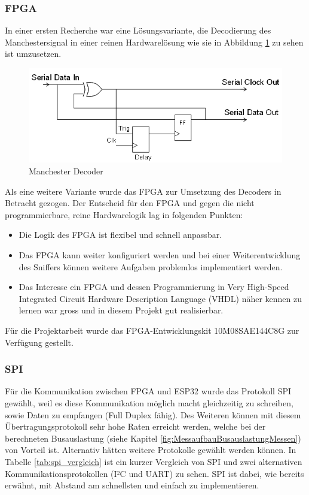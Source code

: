\subsubsection{FPGA}
In einer ersten Recherche war eine Lösungsvariante, die Decodierung des Manchestersignal in einer reinen Hardwarelösung wie sie in Abbildung \ref{fig:Manchester Decoder} zu sehen ist umzusetzen.

\begin{figure}[H]
    \centering
    \includegraphics[width=0.6\linewidth]{Figures/Chap3/Design Eigener Sniffer/manchester_decoder.png}
    \caption{Manchester Decoder \cite{Manchester_Decoding}}
    \label{fig:Manchester Decoder}
\end{figure}

Als eine weitere Variante wurde das FPGA zur Umsetzung des Decoders in Betracht gezogen.
Der Entscheid für den FPGA und gegen die nicht programmierbare, reine Hardwarelogik lag in folgenden Punkten:
\begin{itemize}
  \item Die Logik des FPGA ist flexibel und schnell anpassbar.
  \item Das FPGA kann weiter konfiguriert werden und bei einer Weiterentwicklung des Sniffers können weitere Aufgaben problemlos implementiert werden.
  \item Das Interesse ein FPGA und dessen Programmierung in Very High-Speed Integrated Circuit Hardware Description Language (VHDL) näher kennen zu lernen war gross und in diesem Projekt gut realisierbar.
\end{itemize}

Für die Projektarbeit wurde das FPGA-Entwicklungskit 10M08SAE144C8G zur Verfügung gestellt.

\subsubsection{SPI}
Für die Kommunikation zwischen FPGA und ESP32 wurde das Protokoll SPI gewählt, weil es diese Kommunikation möglich macht gleichzeitig zu schreiben, sowie Daten zu empfangen (Full Duplex fähig). Des Weiteren können mit diesem Übertragungsprotokoll sehr hohe Raten erreicht werden, welche bei der berechneten Busauslastung (siehe Kapitel \ref{fig:MessaufbauBusauslastungMessen}) von Vorteil ist. Alternativ hätten weitere Protokolle gewählt werden können. In Tabelle \ref{tab:spi_vergleich} ist ein kurzer Vergleich von SPI und zwei alternativen Kommunikationsprotokollen (I²C und UART) zu sehen. SPI ist dabei, wie bereits erwähnt, mit Abstand am schnellsten und einfach zu implementieren.

